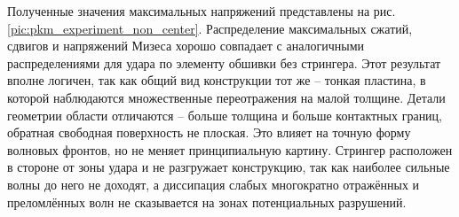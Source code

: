 Полученные значения максимальных напряжений представлены на рис. \ref{pic:pkm_experiment_non_center}. Распределение максимальных сжатий, сдвигов и напряжений Мизеса хорошо совпадает с аналогичными распределениями для удара по элементу обшивки без стрингера. Этот результат вполне логичен, так как общий вид конструкции тот же -- тонкая пластина, в которой наблюдаются множественные переотражения на малой толщине. Детали геометрии области отличаются -- больше толщина и больше контактных границ, обратная свободная поверхность не плоская. Это влияет на точную форму волновых фронтов, но не меняет принципиальную картину. Стрингер расположен в стороне от зоны удара и не разгружает конструкцию, так как наиболее сильные волны до него не доходят, а диссипация слабых многократно отражённых и преломлённых волн не сказывается на зонах потенциальных разрушений.


